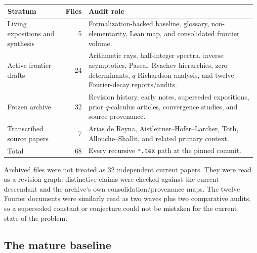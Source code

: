 \documentclass[11pt,oneside]{article}
\numberwithin{equation}{section}
\theoremstyle{frontier}
\theoremstyle{definition}
\theoremstyle{remark}
\begin{document}
\begin{center}
\begin{tabularx}{\textwidth}{@{}l r X@{}}
\toprule
Stratum & Files & Audit role\\
\midrule
Living expositions and synthesis & 5 & Formalization-backed baseline, glossary,
non-elementarity, Lean map, and consolidated frontier volume.\\
Active frontier drafts & 24 & Arithmetic rays, half-integer spectra, inverse asymptotics,
Pascal--Rvachev hierarchies, zero determinants, $q$-Richardson analysis, and twelve
Fourier-decay reports/audits.\\
Frozen archive & 32 & Revision history, early notes, superseded expositions, prior
$q$-calculus articles, convergence studies, and source provenance.\\
Transcribed source papers & 7 & Arias de Reyna, Aistleitner--Hofer--Larcher, Toth,
Allouche--Shallit, and related primary context.\\
\midrule
Total & 68 & Every recursive \texttt{*.tex} path at the pinned commit.\\
\bottomrule
\end{tabularx}
\end{center}

Archived files were not treated as 32 independent current papers.  They were read as a
revision graph: distinctive claims were checked against the current descendant and the
archive's own consolidation/provenance maps.  The twelve Fourier documents were similarly
read as two waves plus two comparative audits, so a superseded constant or conjecture could
not be mistaken for the current state of the problem.

\subsection{The mature baseline}
\end{document}
